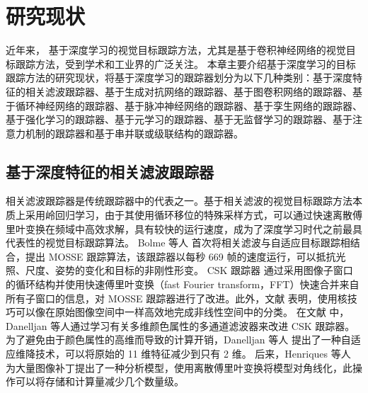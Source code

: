 \chapter{研究现状} \label{chap:related}
近年来，
基于深度学习的视觉目标跟踪方法，尤其是基于卷积神经网络的视觉目标跟踪方法，受到学术和工业界的广泛关注。
本章主要介绍基于深度学习的目标跟踪方法的研究现状，将基于深度学习的跟踪器划分为以下几种类别：基于深度特征的相关滤波跟踪器、基于生成对抗网络的跟踪器、基于图卷积网络的跟踪器、基于循环神经网络的跟踪器、基于脉冲神经网络的跟踪器、基于孪生网络的跟踪器、基于强化学习的跟踪器、基于元学习的跟踪器、基于无监督学习的跟踪器、基于注意力机制的跟踪器和基于串并联或级联结构的跟踪器。

\section{基于深度特征的相关滤波跟踪器}
相关滤波跟踪器是传统跟踪器中的代表之一。基于相关滤波的视觉目标跟踪方法本质上采用岭回归学习，由于其使用循环移位的特殊采样方式，可以通过快速离散傅里叶变换在频域中高效求解，具有较快的运行速度，成为了深度学习时代之前最具代表性的视觉目标跟踪算法。
Bolme 等人 \cite{MOSSE} 首次将相关滤波与自适应目标跟踪相结合，提出 MOSSE 跟踪算法，该跟踪器以每秒 669 帧的速度运行，可以抵抗光照、尺度、姿势的变化和目标的非刚性形变。
CSK 跟踪器 \cite{Henriques2012ExploitingTC} 通过采用图像子窗口的循环结构并使用快速傅里叶变换（fast Fourier transform，FFT）快速合并来自所有子窗口的信息，对 MOSSE 跟踪器进行了改进。此外，文献 \cite{Henriques2012ExploitingTC} 表明，使用核技巧可以像在原始图像空间中一样高效地完成非线性空间中的分类。
在文献 \cite{Danelljan2014AdaptiveCA} 中，Danelljan 等人通过学习有关多维颜色属性的多通道滤波器来改进 CSK 跟踪器。为了避免由于颜色属性的高维而导致的计算开销，Danelljan 等人 \cite{Danelljan2014AdaptiveCA} 提出了一种自适应维降技术，可以将原始的 11 维特征减少到只有 2 维。
后来，Henriques 等人 \cite{henriques2014high-speed} 为大量图像补丁提出了一种分析模型，使用离散傅里叶变换将模型对角线化，此操作可以将存储和计算量减少几个数量级。

